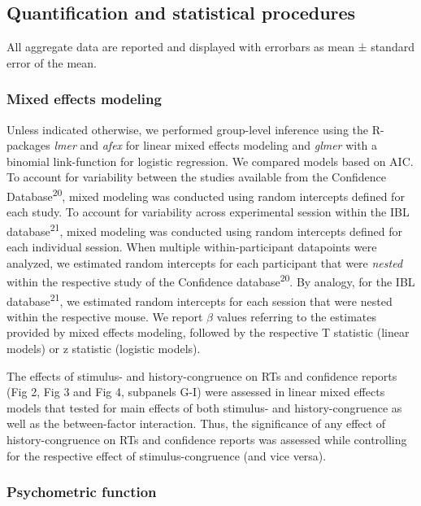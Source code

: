 \documentclass[
]{article}
\begin{document}
\hypertarget{quantification-and-statistical-procedures}{%
\subsection{Quantification and statistical
procedures}\label{quantification-and-statistical-procedures}}

All aggregate data are reported and displayed with errorbars as mean ±
standard error of the mean.

\hypertarget{mixed-effects-modeling}{%
\subsubsection{Mixed effects modeling}\label{mixed-effects-modeling}}

Unless indicated otherwise, we performed group-level inference using the
R-packages \emph{lmer} and \emph{afex} for linear mixed effects modeling
and \emph{glmer} with a binomial link-function for logistic regression.
We compared models based on AIC. To account for variability between the
studies available from the Confidence Database\textsuperscript{20},
mixed modeling was conducted using random intercepts defined for each
study. To account for variability across experimental session within the
IBL database\textsuperscript{21}, mixed modeling was conducted using
random intercepts defined for each individual session. When multiple
within-participant datapoints were analyzed, we estimated random
intercepts for each participant that were \emph{nested} within the
respective study of the Confidence database\textsuperscript{20}. By
analogy, for the IBL database\textsuperscript{21}, we estimated random
intercepts for each session that were nested within the respective
mouse. We report \(\beta\) values referring to the estimates provided by
mixed effects modeling, followed by the respective T statistic (linear
models) or z statistic (logistic models).

The effects of stimulus- and history-congruence on RTs and confidence
reports (Fig 2, Fig 3 and Fig 4, subpanels G-I) were assessed in linear mixed
effects models that tested for main effects of both stimulus- and
history-congruence as well as the between-factor interaction. Thus, the
significance of any effect of history-congruence on RTs and confidence
reports was assessed while controlling for the respective effect of
stimulus-congruence (and vice versa).

\hypertarget{psychometric-function}{%
\subsubsection{Psychometric function}\label{psychometric-function}}
\end{document}
